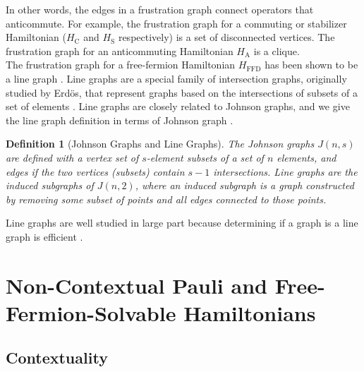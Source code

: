 \documentclass[%
 aip,
 amsmath,amssymb,
 reprint,%
]{revtex4-1}
\newtheorem{identity}{{Definition}}
\newcommand{\stabilizerHamiltonian}{H_{\mathrm{S}}}
\newcommand{\commutingHamiltonian}{H_{\mathrm{C}}}
\newcommand{\anticommutingHamiltonian}{H_{\mathrm{A}}}
\newcommand{\freeFermionHamiltonian}{H_{\mathrm{FFD}}}
\begin{document}
\indent In other words, the edges in a frustration graph connect operators that anticommute. For example, the frustration graph for a commuting or stabilizer Hamiltonian ($\commutingHamiltonian$ and $\stabilizerHamiltonian$ respectively) is a set of disconnected vertices. The frustration graph for an anticommuting Hamiltonian $\anticommutingHamiltonian$ is a clique. \\
\indent The frustration graph for a free-fermion Hamiltonian $\freeFermionHamiltonian$ has been shown to be a line graph \cite{beineke1968derived}. Line graphs are a special family of intersection graphs, originally studied by Erd\"os, that represent graphs based on the intersections of subsets of a set of elements \cite{Erdos1966Representation}. Line graphs are closely related to Johnson graphs, and we give the line graph definition in terms of Johnson graph \cite{Holton_Sheehan_1993, harary1969graph}. 

\begin{identity}[Johnson Graphs and Line Graphs]
    The Johnson graphs $J(n,s)$ are defined with a vertex set of $s$-element subsets of a set of $n$ elements, and edges if the two vertices (subsets) contain $s-1$ intersections. Line graphs are the induced subgraphs of $J(n,2)$, where an induced subgraph is a graph constructed by removing some subset of points and all edges connected to those points. 
\end{identity}

Line graphs are well studied in large part because determining if a graph is a line graph is efficient \cite{ROUSSOPOULOS1973108}. 





\section{Non-Contextual Pauli and Free-Fermion-Solvable Hamiltonians}
\label{sec:Background}

\subsection{Contextuality}
\label{sec:contextuality}
\end{document}
